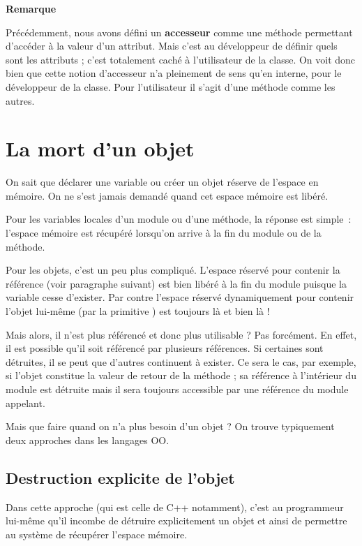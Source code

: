 	\textbf{Remarque}
	
	Précédemment, nous avons défini un \textbf{accesseur} comme une méthode
	permettant d’accéder à la valeur d’un attribut. Mais c’est au
	développeur de définir quels sont les attributs ; c’est totalement caché
	à l’utilisateur de la classe. On voit donc bien que cette notion
	d’accesseur n’a pleinement de sens qu’en interne, pour le développeur
	de la classe. Pour l’utilisateur il s’agit d’une méthode comme les
	autres.


\section{La mort d'un objet}

	On sait que déclarer une variable ou créer un objet réserve de l’espace
	en mémoire. On ne s’est jamais demandé quand cet espace mémoire est
	libéré.
	
	Pour les variables locales d’un module ou d'une
	méthode, la réponse est simple~: l’espace mémoire est récupéré
	lorsqu’on arrive à la fin du module ou de la méthode.
	
	Pour les objets, c’est un peu plus compliqué. L’espace réservé pour
	contenir la référence (voir paragraphe suivant) est bien libéré à la
	fin du module puisque la variable cesse d’exister. Par contre l’espace
	réservé dynamiquement pour contenir l’objet lui-même (par la primitive
	) est toujours là et bien là !
	
	Mais alors, il n’est plus référencé et donc plus utilisable ? Pas
	forcément. En effet, il est possible qu’il soit référencé par plusieurs
	références. Si certaines sont détruites, il se peut que d’autres
	continuent à exister. Ce sera le cas, par exemple, si l’objet constitue
	la valeur de retour de la méthode ; sa référence à l’intérieur du
	module est détruite mais il sera toujours accessible par une référence
	du module appelant.
	
	Mais que faire quand on n’a plus besoin d’un objet ? On trouve
	typiquement deux approches dans les langages OO.

	\subsection{Destruction explicite de l’objet}
	
		Dans cette approche (qui est celle de C++ notamment), c’est au
		programmeur lui-même qu’il incombe de détruire explicitement un objet
		et ainsi de permettre au système de récupérer l’espace mémoire. 
		
